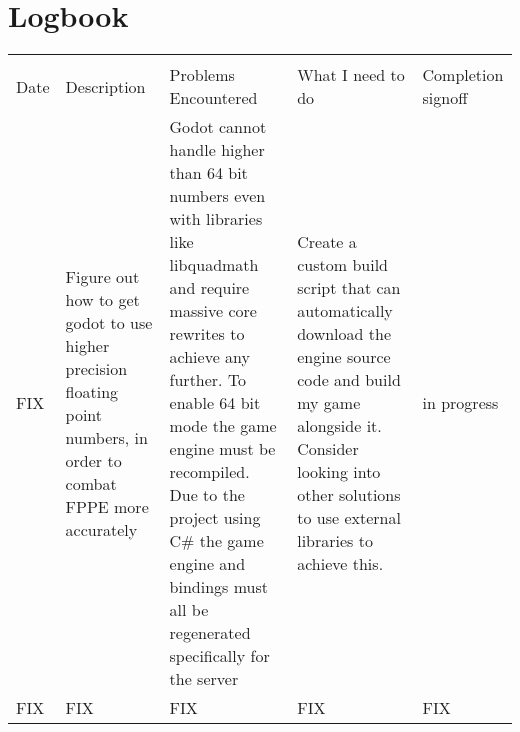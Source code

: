 \documentclass[12pt, DIV=calc]{scrartcl}
\begin{document}
\section{Logbook}
\begin{xltabular}[c]{\textwidth}{| X | X | X | X | X |}
    \hline \\
Date & Description & Problems Encountered & What I need to do & Completion signoff \\ \hline

FIX & Figure out how to get godot to use higher precision floating point numbers, in order to combat FPPE more accurately & Godot cannot handle higher than 64 bit numbers even with libraries like libquadmath and require massive core rewrites to achieve any further. To enable 64 bit mode the game engine must be recompiled. Due to the project using C\# the game engine and bindings must all be regenerated specifically for the server & Create a custom build script that can automatically download the engine source code and build my game alongside it. Consider looking into other solutions to use external libraries to achieve this. & in progress \\ \hline
FIX & FIX & FIX & FIX & FIX \\
    \hline
\end{xltabular}
\end{document}
